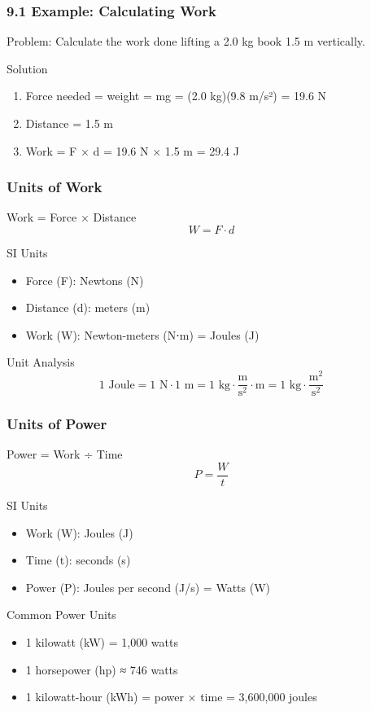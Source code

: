 \documentclass{beamer}
\begin{document}
\begin{frame}
\frametitle{9.1 Example: Calculating Work}
Problem: Calculate the work done lifting a 2.0 kg book 1.5 m vertically.
\begin{block}{Solution}
\begin{enumerate}
\item Force needed = weight = mg = (2.0 kg)(9.8 m/s²) = 19.6 N
\item Distance = 1.5 m
\item Work = F × d = 19.6 N × 1.5 m = 29.4 J
\end{enumerate}
\end{block}
\end{frame}
\begin{frame}
\frametitle{Units of Work}
\begin{block}{Work = Force × Distance}
$$W = F \cdot d$$
\end{block}

\begin{block}{SI Units}
\begin{itemize}
\item Force (F): Newtons (N)
\item Distance (d): meters (m)
\item Work (W): Newton-meters (N⋅m) = Joules (J)
\end{itemize}
\end{block}

\begin{block}{Unit Analysis}
$$1 \text{ Joule} = 1 \text{ N} \cdot 1 \text{ m} = 1 \text{ kg}\cdot\frac{\text{m}}{\text{s}^2} \cdot \text{m} = 1 \text{ kg}\cdot\frac{\text{m}^2}{\text{s}^2}$$
\end{block}
\end{frame}

\begin{frame}
\frametitle{Units of Power}
\begin{block}{Power = Work ÷ Time}
$$P = \frac{W}{t}$$
\end{block}

\begin{block}{SI Units}
\begin{itemize}
\item Work (W): Joules (J)
\item Time (t): seconds (s)
\item Power (P): Joules per second (J/s) = Watts (W)
\end{itemize}
\end{block}

\begin{block}{Common Power Units}
\begin{itemize}
\item 1 kilowatt (kW) = 1,000 watts
\item 1 horsepower (hp) ≈ 746 watts
\item 1 kilowatt-hour (kWh) = power × time = 3,600,000 joules
\end{itemize}
\end{block}
\end{frame}
\end{document}
